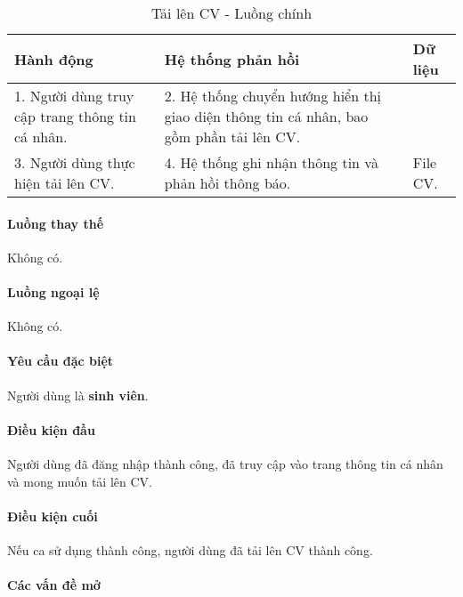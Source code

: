 \documentclass[./../main.tex]{subfiles}
\begin{document}
\begin{table}[H]
	\caption{Tải lên CV - Luồng chính}
	\label{tab:upload_cv}
	\begin{tabularx}{\textwidth}{|X|X|X|}
		\hline
		\textbf{Hành động}                              & \textbf{Hệ thống phản hồi}                                                              & \textbf{Dữ liệu} \\ \hline
		1. Người dùng truy cập trang thông tin cá nhân. & 2. Hệ thống chuyển hướng hiển thị giao diện thông tin cá nhân, bao gồm phần tải lên CV. &                  \\ \hline
		3. Người dùng thực hiện tải lên CV.             & 4. Hệ thống ghi nhận thông tin và phản hồi thông báo.                                   & File CV.         \\ \hline
	\end{tabularx}
\end{table}

\paragraph*{Luồng thay thế} Không có.

\paragraph*{Luồng ngoại lệ} Không có.

\paragraph*{Yêu cầu đặc biệt}

Người dùng là \textbf{sinh viên}.

\paragraph*{Điều kiện đầu}

Người dùng đã đăng nhập thành công, đã truy cập vào trang thông tin cá nhân và mong muốn tải lên CV.

\paragraph*{Điều kiện cuối}

Nếu ca sử dụng thành công, người dùng đã tải lên CV thành công.

\paragraph*{Các vấn đề mở}
\end{document}
